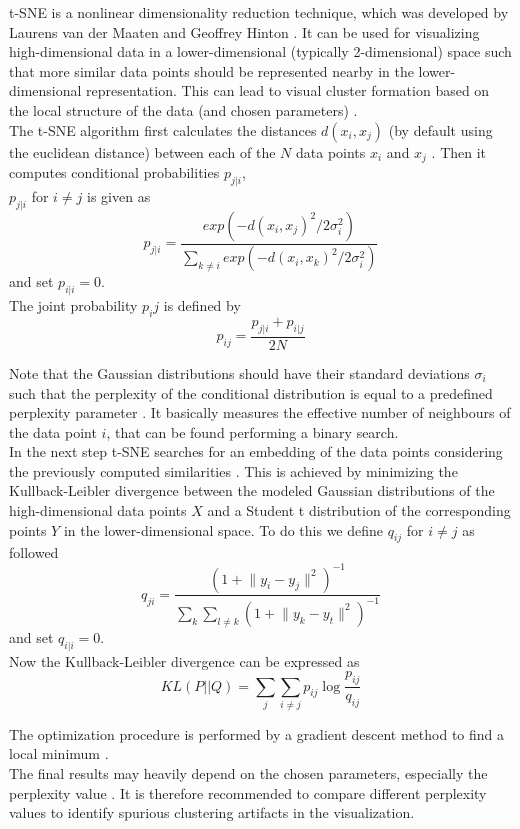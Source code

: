 t-SNE is a nonlinear dimensionality reduction technique, which was developed by Laurens van der Maaten and Geoffrey Hinton \cite{tsne}. It can be used for visualizing high-dimensional data in a lower-dimensional (typically 2-dimensional) space such that more similar data points should be represented nearby in the lower-dimensional representation. This can lead to visual cluster formation based on the local structure of the data (and chosen parameters) \cite{wattenberg2016how}.  \\
The t-SNE algorithm first calculates the distances $d(x_i, x_j)$ (by default using the euclidean distance) between each of the $N$ data points $x_i$ and $x_j$ \cite{tsne_matlab}. Then it computes conditional probabilities $p_{j|i}$, \cite{tsne} \\
$p_{j|i}$ for $i \neq j$ is given as
\begin{equation}
	p_{j|i} = \frac{exp(-d(x_i, x_j)^2 / 2\sigma_i^2)}{\sum_{k \neq i} exp(-d(x_i, x_k)^2 / 2\sigma_i^2)} 
\end{equation}
and set $p_{i|i} = 0$. \\
The joint probability $p_ij$ is defined by 
\begin{equation}
	p_{ij} = \frac{p_{j|i} + p_{i|j}}{2N}
\end{equation}

Note that the Gaussian distributions should have their standard deviations $\sigma_i$ such that the perplexity of the conditional distribution is equal to a predefined perplexity parameter \cite{tsne_matlab}. It basically measures the effective number of neighbours of the data point $i$, that can be found performing a binary search.   \\
In the next step t-SNE searches for an embedding of the data points considering the previously computed similarities \cite{tsne_matlab}. This is achieved by minimizing the Kullback-Leibler divergence between the modeled Gaussian distributions of the high-dimensional data points $X$ and a Student t distribution of the corresponding points $Y$ in the lower-dimensional space. To do this we define $q_{ij}$ for $i \neq j$ as followed 
\begin{equation}
	q_{ji} = \frac{(1 + \lVert y_i - y_j \rVert ^2)^{-1}}{\sum_{k}\sum_{l \neq k} (1 + \lVert y_k - y_t \rVert ^2)^{-1}}
\end{equation}
and set $q_{i|i} = 0$. \\
Now the Kullback-Leibler divergence can be expressed as \\
\begin{equation}
	KL(P||Q) = \sum_{j}\sum_{i \neq j}p_{ij}\log\frac{p_{ij}}{q_{ij}}
\end{equation}

The optimization procedure is performed by a gradient descent method to find a local minimum \cite{tsne_matlab}. \\
The final results may heavily depend on the chosen parameters, especially the perplexity value \cite{wattenberg2016how}. It is therefore recommended to compare different perplexity values to identify spurious clustering artifacts in the visualization.
